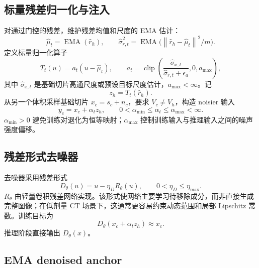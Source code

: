 \documentclass[11pt,a4paper,UTF8,fontset=fandol]{ctexart}
\theoremstyle{definition}
\DeclareMathOperator{\EMA}{EMA}
\DeclareMathOperator{\clip}{clip}
\newcommand{\norm}[1]{\left\lVert#1\right\rVert}
\begin{document}
\subsection{标量残差归一化与注入}

对通过门控的残差，维护残差均值和尺度的 EMA 估计：
\begin{equation}
\label{eq:residual-stat}
    \hat\mu_t=\EMA(\hat r_h),
    \qquad
    \hat\sigma_{r,t}^2=\EMA\big(\norm{\hat r_h-\hat\mu_t}^2/m\big).
\end{equation}
定义标量归一化算子
\begin{equation}
\label{eq:scalar-normalizer}
    T_t(u)=a_t(u-\hat\mu_t),
    \qquad
    a_t=\clip\left(
    \frac{\hat\sigma_{x,t}}{\hat\sigma_{r,t}+\epsilon_a},
    0,
    a_{\max}
    \right),
\end{equation}
其中 $\hat\sigma_{x,t}$ 是基础切片高通尺度或预设目标尺度估计，$a_{\max}<\infty$。记
\begin{equation}
\label{eq:normalized-residual}
    z_h=T_t(\hat r_h).
\end{equation}
从另一个体积采样基础切片 $x_c=s_c+n_c$，要求 $V_c\ne V_h$，构造 noisier 输入
\begin{equation}
\label{eq:yc-scalar}
    y_c=x_c+\alpha_t z_h,
    \qquad
    0<\alpha_{\min}\le\alpha_t\le\alpha_{\max}<\infty.
\end{equation}
$\alpha_{\min}>0$ 避免训练对退化为恒等映射；$\alpha_{\max}$ 控制训练输入与推理输入之间的噪声强度偏移。

\subsection{残差形式去噪器}

去噪器采用残差形式
\begin{equation}
\label{eq:denoiser-residual}
    D_\theta(u)=u-\eta_D R_\theta(u),
    \qquad
    0<\eta_D\le\eta_{\max}.
\end{equation}
$R_\theta$ 由轻量卷积残差网络实现。该形式使网络主要学习待移除成分，而非直接生成完整图像；在低剂量 CT 场景下，这通常更容易约束动态范围和局部 Lipschitz 常数。训练目标为
\begin{equation}
\label{eq:n2n-training-pair}
    D_\theta(x_c+\alpha_t z_h)\approx x_c.
\end{equation}
推理阶段直接输出 $D_\theta(x)$。

\subsection{EMA denoised anchor}
\end{document}

